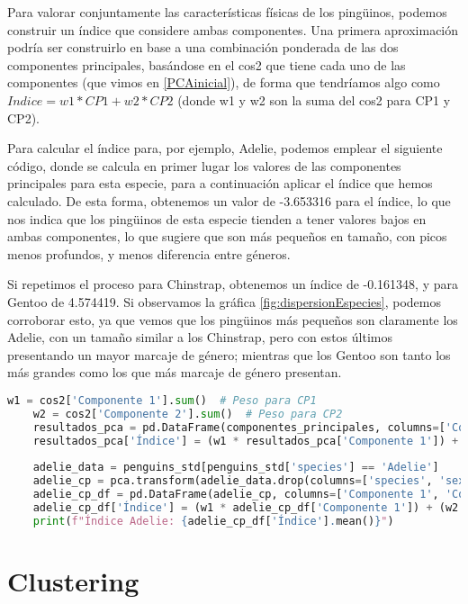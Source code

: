 \documentclass[a4paper,onecolumn]{extarticle}
\let\stdsection\section
\renewcommand\section{\newpage\stdsection}
\begin{document}
\begin{sloppypar}
Para valorar conjuntamente las características físicas de los pingüinos, podemos construir un índice que considere ambas componentes. Una primera aproximación 
podría ser construirlo en base a una combinación ponderada de las dos componentes principales, basándose en el cos2 que tiene cada uno de las componentes 
(que vimos en \ref{PCAinicial}), de forma que tendríamos algo como $Indice = w1*CP1 + w2*CP2$ (donde w1 y w2 son la suma del cos2 para CP1 y CP2). 

Para calcular el índice para, por ejemplo, Adelie, podemos emplear el siguiente código, donde se calcula en primer lugar los valores de las componentes 
principales para esta especie, para a continuación aplicar el índice que hemos calculado. De esta forma, obtenemos un valor de -3.653316 para el índice, lo que 
nos indica que los pingüinos de esta especie tienden a tener valores bajos en ambas componentes, lo que sugiere que son más pequeños en tamaño, con picos menos 
profundos, y menos diferencia entre géneros.

Si repetimos el proceso para Chinstrap, obtenemos un índice de -0.161348, y para Gentoo de 4.574419. Si observamos 
la gráfica \ref{fig:dispersionEspecies}, podemos corroborar esto, ya que vemos que los pingüinos más pequeños son claramente los Adelie, con un tamaño similar 
a los Chinstrap, pero con estos últimos presentando un mayor marcaje de género; mientras que los Gentoo son tanto los más grandes como los que más marcaje de 
género presentan.
\begin{lstlisting}[language=Python]
    w1 = cos2['Componente 1'].sum()  # Peso para CP1
    w2 = cos2['Componente 2'].sum()  # Peso para CP2
    resultados_pca = pd.DataFrame(componentes_principales, columns=['Componente 1', 'Componente 2'])
    resultados_pca['Índice'] = (w1 * resultados_pca['Componente 1']) + (w2 * resultados_pca['Componente 2'])
    
    adelie_data = penguins_std[penguins_std['species'] == 'Adelie']
    adelie_cp = pca.transform(adelie_data.drop(columns=['species', 'sex']))
    adelie_cp_df = pd.DataFrame(adelie_cp, columns=['Componente 1', 'Componente 2'])
    adelie_cp_df['Índice'] = (w1 * adelie_cp_df['Componente 1']) + (w2 * adelie_cp_df['Componente 2'])
    print(f"Índice Adelie: {adelie_cp_df['Índice'].mean()}")
\end{lstlisting}

\section{Clustering} \label{clustering}

\end{sloppypar}
\end{document}
